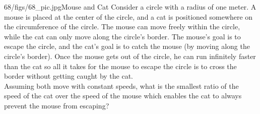 \begin{problem}{68/figs/68_pic.jpg}{Mouse and Cat} Consider a circle with a radius of one meter. A mouse is placed at the center of the circle, and a cat is positioned somewhere on the circumference of the circle. The mouse can move freely within the circle, while the cat can only move along the circle's border. The mouse's goal is to escape the circle, and the cat's goal is to catch the mouse (by moving along the circle's border).
Once the mouse gets out of the circle, he can run infinitely faster than the cat so all it takes for the mouse to escape the circle is to cross the border without getting caught by the cat.\\[0.2cm]

Assuming both move with constant speeds, what is the smallest ratio of the speed of the cat over the speed of the mouse which enables the cat to always prevent the mouse from escaping?
\end{problem}
